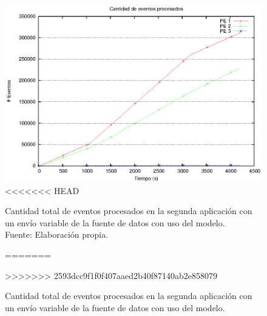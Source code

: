 \begin{figure}[!ht]
	\centering
	\captionsetup{justification=centering}
    \includegraphics[scale=0.7]{images/exp/app2/normal/cm/eventCount.eps}
<<<<<<< HEAD
    \caption[Cantidad total de eventos procesados en la segunda aplicación con un envío variable de la fuente de datos con uso del modelo.]{Cantidad total de eventos procesados en la segunda aplicación con un envío variable de la fuente de datos con uso del modelo.\\Fuente: Elaboración propia.}
=======
    \caption{Cantidad total de eventos procesados en la segunda aplicaci\'on con un env\'io variable de la fuente de datos con uso del modelo.}
>>>>>>> 2593dcc9f1f0f407aaed2b40f87140ab2e858079
    \label{fig:app2-normal-eventCount-cm}
\end{figure}

